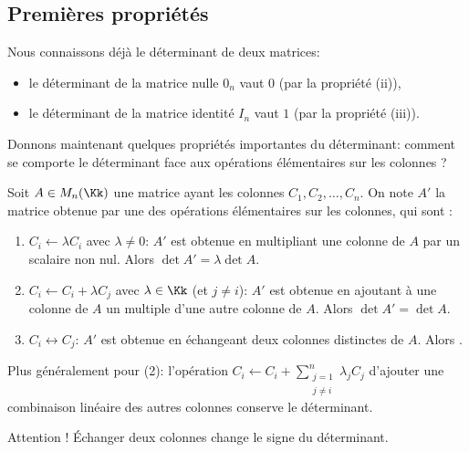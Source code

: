 \documentclass[class=report,crop=false]{standalone}
\begin{document}
\subsection{Premières propriétés}	\label{sec:premieres-proprietes}


Nous connaissons déjà le déterminant de deux matrices:
\begin{itemize}
  \item le déterminant de la matrice nulle $0_n$ vaut $0$ (par la propriété (ii)),
  \item le déterminant de la matrice identité $I_n$ vaut $1$ (par la propriété (iii)).
\end{itemize}

\bigskip

Donnons maintenant quelques propriétés importantes du déterminant: comment se comporte le déterminant
face aux opérations élémentaires sur les colonnes ?

\begin{proposition}
\label{prop:detoperation}
Soit $A \in M_n(\Kk)$ une matrice
ayant les colonnes $C_1, C_2, \ldots, C_n$.
On note $A'$ la matrice obtenue par une des opérations élémentaires sur les colonnes, qui sont :
\begin{enumerate}
  \item $C_i \leftarrow \lambda C_i$ avec $\lambda \neq 0$:
  $A'$ est obtenue en multipliant une colonne de $A$ par un scalaire non nul.
  Alors $\det A' = \lambda \det A$.

  \item $C_i \leftarrow C_i+\lambda C_j$ avec $\lambda \in \Kk$ (et $j\neq i$):
  $A'$ est obtenue en ajoutant à une colonne de $A$ un multiple d'une autre colonne de $A$.
  Alors $\det A' = \det A$.

  \item $C_i \leftrightarrow C_j$: $A'$ est obtenue en échangeant
  deux colonnes distinctes de $A$. Alors .
\end{enumerate}
\end{proposition}

Plus généralement pour (2): l'opération $C_i \leftarrow C_i+\sum_{\substack{j=1 \\ j\neq i}}^n\lambda_j C_j$ d'ajouter
une combinaison linéaire des autres colonnes conserve le déterminant.

Attention ! \'Echanger deux colonnes change le signe du déterminant.
\end{document}
